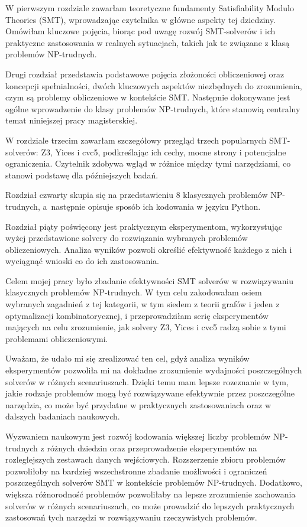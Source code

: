 \documentclass[xodstep]{wnspt}
\begin{document}
W pierwszym rozdziale zawarłam teoretyczne fundamenty Satisfiability Modulo Theories (SMT), wprowadzając czytelnika w główne aspekty tej dziedziny. Omówiłam kluczowe pojęcia, biorąc pod uwagę rozwój SMT-solverów i ich praktyczne zastosowania w realnych sytuacjach, takich jak te związane z klasą problemów NP-trudnych. 

Drugi rozdział przedstawia podstawowe pojęcia złożoności obliczeniowej oraz koncepcji spełnialności, dwóch kluczowych aspektów niezbędnych do zrozumienia, czym są problemy obliczeniowe w kontekście SMT. Następnie dokonywane jest ogólne wprowadzenie do klasy problemów NP-trudnych, które stanowią centralny temat niniejszej pracy magisterskiej.

W rozdziale trzecim zawarłam szczegółowy przegląd trzech popularnych SMT-solverów: Z3, Yices i cvc5, podkreślając ich cechy, mocne strony i potencjalne ograniczenia. Czytelnik zdobywa wgląd w różnice między tymi narzędziami, co stanowi podstawę dla późniejszych badań.

Rozdział czwarty skupia się na przedstawieniu 8 klasycznych problemów NP-trudnych, a~następnie opisuje sposób ich kodowania w języku Python.

Rozdział piąty poświęcony jest praktycznym eksperymentom, wykorzystując wyżej przedstawione solvery do rozwiązania wybranych problemów obliczeniowych. Analiza wyników pozwoli określić efektywność każdego z nich i wyciągnąć wnioski co do ich zastosowania.








\summary
Celem mojej pracy było zbadanie efektywności SMT solverów w rozwiązywaniu klasycznych problemów NP-trudnych. W tym celu zakodowałam osiem wybranych zagadnień z tej kategorii, w tym siedem z teorii grafów i jeden z optymalizacji kombinatorycznej, i przeprowadziłam serię eksperymentów mających na celu zrozumienie, jak solvery Z3, Yices i cvc5 radzą sobie z tymi problemami obliczeniowymi.

Uważam, że udało mi się zrealizować ten cel, gdyż analiza wyników eksperymentów pozwoliła mi na dokładne zrozumienie wydajności poszczególnych solverów w różnych scenariuszach. Dzięki temu mam lepsze rozeznanie w tym, jakie rodzaje problemów mogą być rozwiązywane efektywnie przez poszczególne narzędzia, co może być przydatne w praktycznych zastosowaniach oraz w dalszych badaniach naukowych.

Wyzwaniem naukowym jest rozwój kodowania większej liczby problemów NP-trudnych z różnych dziedzin oraz przeprowadzenie eksperymentów na rozleglejszych zestawach danych wejściowych. Rozszerzenie zbioru problemów pozwoliłoby na bardziej wszechstronne zbadanie możliwości i ograniczeń poszczególnych solverów SMT w kontekście problemów NP-trudnych. Dodatkowo, większa różnorodność problemów pozwoliłaby na lepsze zrozumienie zachowania solverów w różnych scenariuszach, co może prowadzić do lepszych praktycznych zastosowań tych narzędzi w rozwiązywaniu rzeczywistych problemów.
\end{document}
